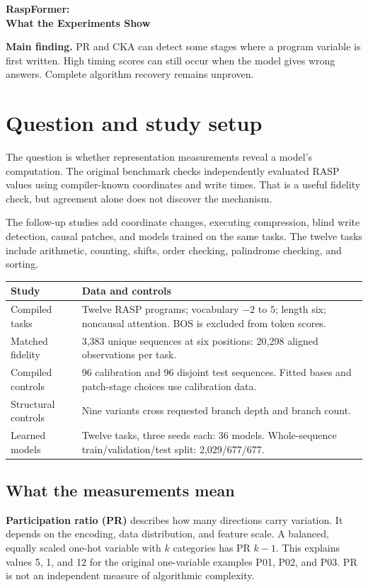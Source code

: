 \documentclass[11pt,a4paper]{article}
\begin{document}
{\sffamily\fontsize{20}{24}\selectfont\bfseries\color{navy}RaspFormer:\\What the Experiments Show}\par
\vspace{2mm}
\textbf{Main finding.} PR and CKA can detect some stages where a program variable is first written. High timing scores can still occur when the model gives wrong answers. Complete algorithm recovery remains unproven.

\section{Question and study setup}
The question is whether representation measurements reveal a model's computation. The original benchmark checks independently evaluated RASP values using compiler-known coordinates and write times. That is a useful fidelity check, but agreement alone does not discover the mechanism.

The follow-up studies add coordinate changes, executing compression, blind write detection, causal patches, and models trained on the same tasks. The twelve tasks include arithmetic, counting, shifts, order checking, palindrome checking, and sorting.

\begin{center}\small
\begin{tabularx}{\linewidth}{@{}P{.27\linewidth}X@{}}
\toprule
\textbf{Study} & \textbf{Data and controls}\\
\midrule
Compiled tasks & Twelve RASP programs; vocabulary $-2$ to $5$; length six; noncausal attention. BOS is excluded from token scores.\\
Matched fidelity & 3,383 unique sequences at six positions: 20,298 aligned observations per task.\\
Compiled controls & 96 calibration and 96 disjoint test sequences. Fitted bases and patch-stage choices use calibration data.\\
Structural controls & Nine variants cross requested branch depth and branch count.\\
Learned models & Twelve tasks, three seeds each: 36 models. Whole-sequence train/validation/test split: 2,029/677/677.\\
\bottomrule
\end{tabularx}\end{center}

\subsection*{What the measurements mean}
\textbf{Participation ratio (PR)} describes how many directions carry variation. It depends on the encoding, data distribution, and feature scale. A balanced, equally scaled one-hot variable with $k$ categories has PR $k-1$. This explains values 5, 1, and 12 for the original one-variable examples P01, P02, and P03. PR is not an independent measure of algorithmic complexity.
\end{document}
